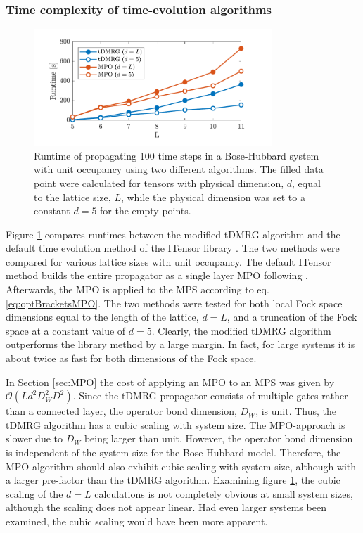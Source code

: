 \subsubsection{Time complexity of time-evolution algorithms}
\begin{figure}[h!]
    \centering
    \includegraphics[width=0.8\textwidth]{Figures/CompareRuntime.pdf}
    \caption{Runtime of propagating 100 time steps in a Bose-Hubbard system with unit occupancy using two different algorithms. The filled data point were calculated for tensors with physical dimension, $d$, equal to the lattice size, $L$, while the physical dimension was set to a constant $d = 5$ for the empty points. }
    \label{fig:CompareRuntime}
\end{figure}
Figure \ref{fig:CompareRuntime} compares runtimes between the modified tDMRG algorithm and the default time evolution method of the ITensor library \cite{ITensor}. The two methods were compared for various lattice sizes with unit occupancy. The default ITensor method builds the entire propagator as a single layer MPO following \cite{Pollmann2015}. Afterwards, the MPO is applied to the MPS according to eq. \eqref{eq:optBracketsMPO}. The two methods were tested for both local Fock space dimensions equal to the length of the lattice, $d = L$, and a truncation of the Fock space at a constant value of $d = 5$.
Clearly, the modified tDMRG algorithm outperforms the library method by a large margin. In fact, for large systems it is about twice as fast for both dimensions of the Fock space.

In Section \ref{sec:MPO} the cost of applying an MPO to an MPS was given by $\mathcal{O}(L d^2 D_W ^2 D^2)$. Since the tDMRG propagator consists of multiple gates rather than a connected layer, the operator bond dimension, $D_W$, is unit. Thus, the tDMRG algorithm has a cubic scaling with system size. The MPO-approach is slower due to $D_W$ being larger than unit. However, the operator bond dimension is independent of the system size for the Bose-Hubbard model. Therefore, the MPO-algorithm should also exhibit cubic scaling with system size, although with a larger pre-factor than the tDMRG algorithm. Examining figure \ref{fig:CompareRuntime}, the cubic scaling of the $d = L$ calculations is not completely obvious at small system sizes, although the scaling does not appear linear. Had even larger systems been examined, the cubic scaling would have been more apparent.

